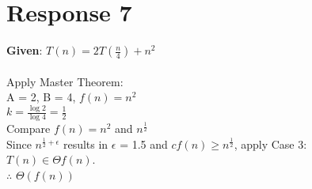 \documentclass[12pt, a4paper]{article}
\begin{document}
\section*{\centering Response 7}
    \textbf{Given}: \(T(n)=2T(\frac{n}{4})+n^2\)\\
    \\
    Apply Master Theorem:\\
    A = 2, B = 4, \(f(n) = n^2\)\\
    \(k = \frac{\log{2}}{\log{4}} = \frac{1}{2}\)\\
    Compare \(f(n) = n^2\) and \(n^{\frac{1}{2}}\)\\
    Since \(n^{\frac{1}{2}+\epsilon}\) results in $\epsilon$ = 1.5 and \(cf(n) \geq n^{\frac{1}{2}}\), apply Case 3:\\
    \(T(n) \in \Theta{f(n)}\).\\
    $\therefore$ $\Theta{(f(n))}$
\end{document}
